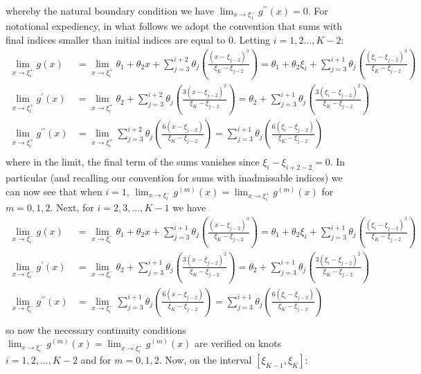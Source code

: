 \documentclass[10pt]{article}
\newcommand{\bp}[1]{\left({#1}\right)}
\newcommand{\1}[1]{\mathbbm{1}_{#1}}
\begin{document}
    whereby the natural boundary condition we have $\lim_{x\rightarrow\xi_1^-}g^{\prime\prime}(x)=0$. For notational expediency, in what follows we adopt the convention that sums with final indices smaller than initial indices are equal to $0$. Letting $i=1,2\dots,K-2$:
    \begin{align*}
        \lim_{x\rightarrow\xi_i^+}g(x)&=\lim_{x\rightarrow\xi_i^+}\theta_1+\theta_2x+\sum_{j=3}^{i+2}\theta_j\bp{\frac{(x-\xi_{j-2})^3}{\xi_K-\xi_{j-2}}}=\theta_1+\theta_2\xi_i+\sum_{j=3}^{i+1}\theta_j\bp{\frac{(\xi_i-\xi_{j-2})^3}{\xi_K-\xi_{j-2}}}\\
        \lim_{x\rightarrow\xi_i^+}g^\prime(x)&=\lim_{x\rightarrow\xi_i^+}\theta_2+\sum_{j=3}^{i+2}\theta_j\bp{\frac{3(x-\xi_{j-2})^2}{\xi_K-\xi_{j-2}}}=\theta_2+\sum_{j=3}^{i+1}\theta_j\bp{\frac{3(\xi_i-\xi_{j-2})^2}{\xi_K-\xi_{j-2}}}\\
        \lim_{x\rightarrow\xi_i^+}g^{\prime\prime}(x)&=\lim_{x\rightarrow\xi_i^+}\sum_{j=3}^{i+2}\theta_j\bp{\frac{6(x-\xi_{j-2})}{\xi_K-\xi_{j-2}}}=\sum_{j=3}^{i+1}\theta_j\bp{\frac{6(\xi_i-\xi_{j-2})}{\xi_K-\xi_{j-2}}}\\
    \end{align*}
    where in the limit, the final term of the sums vanishes since $\xi_{i}-\xi_{i+2-2}=0$. In particular (and recalling our convention for sums with inadmissable indices) we can now see that when $i=1$, $\lim_{x\rightarrow\xi_i^-}g^{(m)}(x)=\lim_{x\rightarrow\xi_i^+}g^{(m)}(x)$ for $m=0,1,2$. Next, for $i=2,3,\dots,K-1$ we have
    \begin{align*}
        \lim_{x\rightarrow\xi_i^-}g(x)&=\lim_{x\rightarrow\xi_i^-}\theta_1+\theta_2x+\sum_{j=3}^{i+1}\theta_j\bp{\frac{(x-\xi_{j-2})^3}{\xi_K-\xi_{j-2}}}=\theta_1+\theta_2\xi_i+\sum_{j=3}^{i+1}\theta_j\bp{\frac{(\xi_i-\xi_{j-2})^3}{\xi_K-\xi_{j-2}}}\\
        \lim_{x\rightarrow\xi_i^-}g^\prime(x)&=\lim_{x\rightarrow\xi_i^-}\theta_2+\sum_{j=3}^{i+1}\theta_j\bp{\frac{3(x-\xi_{j-2})^2}{\xi_K-\xi_{j-2}}}=\theta_2+\sum_{j=3}^{i+1}\theta_j\bp{\frac{3(\xi_i-\xi_{j-2})^2}{\xi_K-\xi_{j-2}}}\\
        \lim_{x\rightarrow\xi_i^-}g^{\prime\prime}(x)&=\lim_{x\rightarrow\xi_i^-}\sum_{j=3}^{i+1}\theta_j\bp{\frac{6(x-\xi_{j-2})}{\xi_K-\xi_{j-2}}}=\sum_{j=3}^{i+1}\theta_j\bp{\frac{6(\xi_i-\xi_{j-2})}{\xi_K-\xi_{j-2}}}\\
    \end{align*}
    so now the necessary continuity conditions $\lim_{x\rightarrow\xi_i^-}g^{(m)}(x)=\lim_{x\rightarrow\xi_i^+}g^{(m)}(x)$ are verified on knots $i=1,2,\dots,K-2$ and for $m=0,1,2$. Now, on the interval $[\xi_{K-1},\xi_K]$:
\end{document}
